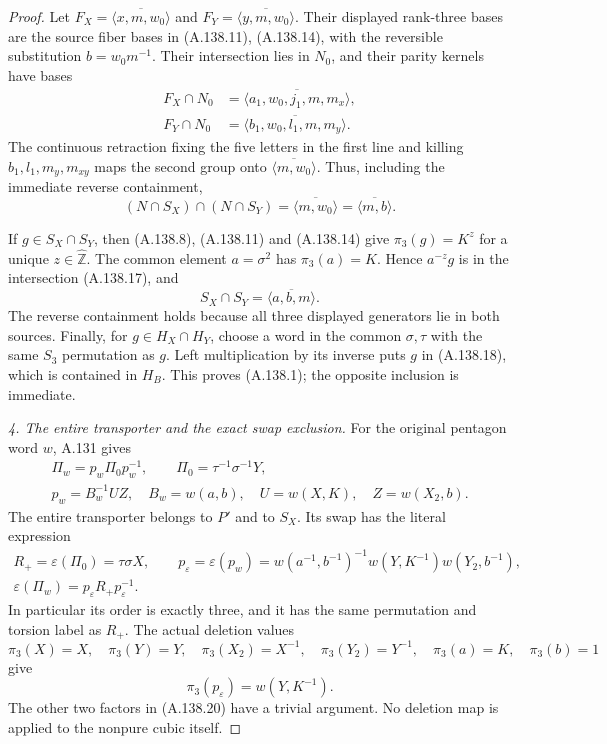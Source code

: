 \begin{proof}
Let \(F_X=\overline{\langle x,m,w_0\rangle}\) and
\(F_Y=\overline{\langle y,m,w_0\rangle}\).
Their displayed rank-three bases are the source fiber bases
in (A.138.11), (A.138.14), with the reversible substitution
\(b=w_0m^{-1}\). Their intersection lies in \(N_0\), and
their parity kernels have bases
\[
\begin{aligned}
 F_X\cap N_0&=\overline{\langle a_1,w_0,j_1,m,m_x\rangle},\\
 F_Y\cap N_0&=\overline{\langle b_1,w_0,l_1,m,m_y\rangle}.
\end{aligned}
\tag{A.138.16}
\]
The continuous retraction fixing the five letters in the first
line and killing \(b_1,l_1,m_y,m_{xy}\) maps the second
group onto \(\overline{\langle m,w_0\rangle}\).
Thus, including the immediate reverse containment,
\[
 (N\cap S_X)\cap(N\cap S_Y)
      =\overline{\langle m,w_0\rangle}
      =\overline{\langle m,b\rangle}.
\tag{A.138.17}
\]

If \(g\in S_X\cap S_Y\), then (A.138.8), (A.138.11)
and (A.138.14) give \(\pi_3(g)=K^z\) for a unique
\(z\in\widehat{\mathbb Z}\).
The common element \(a=\sigma^2\) has \(\pi_3(a)=K\).
Hence \(a^{-z}g\) is in the intersection (A.138.17), and
\[
                    S_X\cap S_Y=\overline{\langle a,b,m\rangle}.
\tag{A.138.18}
\]
The reverse containment holds because all three displayed
generators lie in both sources. Finally, for
\(g\in H_X\cap H_Y\), choose a word in the common
\(\sigma,\tau\) with the same \(S_3\) permutation as \(g\).
Left multiplication by its inverse puts \(g\) in
(A.138.18), which is contained in \(H_B\).
This proves (A.138.1); the opposite inclusion is immediate.

\par\smallskip\noindent
\emph{4. The entire transporter and the exact swap exclusion.}
For the original pentagon word \(w\), A.131 gives
\[
\begin{gathered}
 \Pi_w=p_w\Pi_0p_w^{-1},\qquad
 \Pi_0=\tau^{-1}\sigma^{-1}Y,\\
 p_w=B_w^{-1}UZ,\quad
 B_w=w(a,b),\quad U=w(X,K),\quad Z=w(X_2,b).
\end{gathered}
\tag{A.138.19}
\]
The entire transporter belongs to \(P'\) and to \(S_X\).
Its swap has the literal expression
\[
\begin{gathered}
 R_+=\varepsilon(\Pi_0)=\tau\sigma X,\qquad
 p_\varepsilon=\varepsilon(p_w)
      =w(a^{-1},b^{-1})^{-1}
          w(Y,K^{-1})w(Y_2,b^{-1}),\\
 \varepsilon(\Pi_w)=p_\varepsilon R_+p_\varepsilon^{-1}.
\end{gathered}
\tag{A.138.20}
\]
In particular its order is exactly three, and it has the
same permutation and torsion label as \(R_+\).
The actual deletion values
\[
 \pi_3(X)=X,\quad\pi_3(Y)=Y,\quad
 \pi_3(X_2)=X^{-1},\quad\pi_3(Y_2)=Y^{-1},
 \quad\pi_3(a)=K,\quad\pi_3(b)=1
\]
give
\[
                    \pi_3(p_\varepsilon)=w(Y,K^{-1}).
\tag{A.138.21}
\]
The other two factors in (A.138.20) have a trivial argument.
No deletion map is applied to the nonpure cubic itself.


\end{proof}
